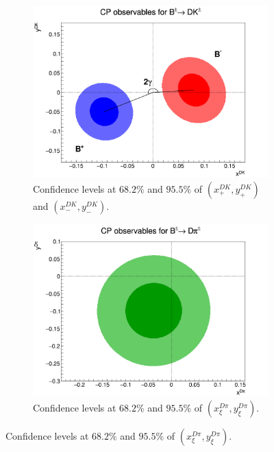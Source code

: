\documentclass[12pt, a4paper, notitlepage, onecolumn]{article}
\numberwithin{equation}{section}
\begin{document}
\begin{figure}[H] 
  \centering
  \begin{subfigure}{0.5\textwidth}
    \centering
    \includegraphics[width=1\textwidth]{Plots/CPContours.png}
    \caption{Confidence levels at $68.2\%$ and $95.5\%$ of $(x_+^{DK}, y_+^{DK})$ and $(x_-^{DK}, y_-^{DK})$.}
    \label{fig_xpm_ypm}
  \end{subfigure}%
  \begin{subfigure}{0.5\textwidth}
    \centering
    \includegraphics[width=1\textwidth]{Plots/CPXiContours.png}
  \caption{Confidence levels at $68.2\%$ and $95.5\%$ of $(x_\xi^{D\pi}, y_\xi^{D\pi})$.}
    \label{fig_xxi_yxi}
  \end{subfigure}
\end{figure}
\end{document}
